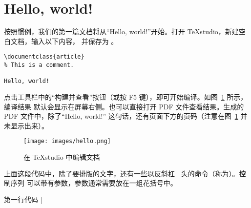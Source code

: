 \section{Hello, world!}

按照惯例，我们的第一篇文档将从“Hello, world!”开始。打开 TeXstudio，新建空白文档，输入以下内容，
并保存为 。

\begin{verbatim}
\documentclass{article}
% This is a comment.

Hello, world!

\end{verbatim}

点击工具栏中的“构建并查看”按钮（或按 F5 键），即可开始编译。如图~\ref{fig:hello} 所示，编译结果
默认会显示在屏幕右侧。也可以直接打开 PDF 文件查看结果。生成的 PDF 文件中，除了“Hello, world!”
这句话，还有页面下方的页码（注意在图~\ref{fig:hello} 并未显示出来）。

\begin{figure}[htb]
  \texttt{[image: images/hello.png]}
  \caption{在 TeXstudio 中编辑文档 }
  \label{fig:hello}
\end{figure}

上面这段代码中，除了要排版的文字，还有一些以反斜杠 |\| 开头的命令（称为）。控制序列
可以带有参数，参数通常需要放在一组花括号中。

第一行代码 |\documentclass{article}| 中包含了命令 。这一命令用来指定，
它是对文档样式的总体设定。 文档类是 \LaTeX{} 的标准文档类之一，表示篇幅较短的文章。

第三行与第五行分别包含了命令  与 。这两个命令以及它们中间的内容称为。
这里就声明了一个名为  的环境。只有在  环境中的内容，才会被排版到文档中。
 与 || 之间的部分称为。对文档样式的所有设置，都应当
放在导言区中。

我们可以发现，内容与格式分离的原则在这里得到了很好的贯彻：文档内容必须放在  环境中，
而排版样式则需要在导言区中定义。如果不遵守这种约定，很有可能导致编译错误。

第二行以百分号 |%
排版结果有任何影响。

\section{你好，world！}


